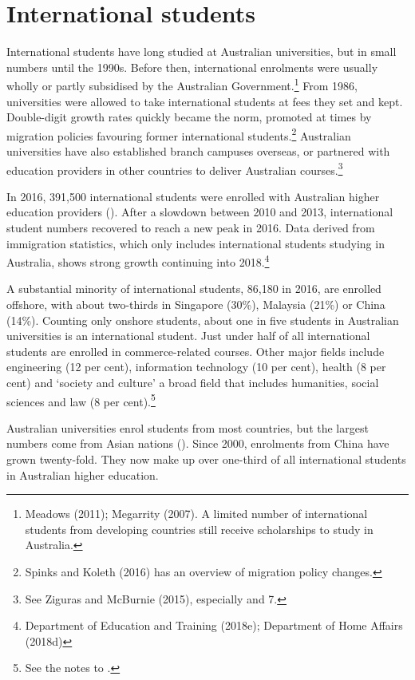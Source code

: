 \documentclass{grattan}
\begin{document}
%
\section{International students }\label{sec:international-students}

International students have long studied at Australian universities, but in small numbers until the 1990s. Before then, international enrolments were usually wholly or partly subsidised by the Australian Government.\footnote{Meadows (2011); Megarrity (2007). A limited number of international students from developing countries still receive scholarships to study in Australia.} From 1986, universities were allowed to take international students at fees they set and kept. Double-digit growth rates quickly became the norm, promoted at times by migration policies favouring former international students.\footnote{Spinks and Koleth (2016) has an overview of migration policy changes.} Australian universities have also established branch campuses overseas, or partnered with education providers in other countries to deliver Australian courses.\footnote{See Ziguras and McBurnie (2015), especially  and 7.}

In 2016, 391,500 international students were enrolled with Australian higher education providers (). After a slowdown between 2010 and 2013, international student numbers recovered to reach a new peak in 2016. Data derived from immigration statistics, which only includes international students studying in Australia, shows strong growth continuing into 2018.\footnote{Department of Education and Training (2018e); Department of Home Affairs (2018d)}

A substantial minority of international students, 86,180 in 2016, are enrolled offshore, with about two-thirds in Singapore (30\%), Malaysia (21\%) or China (14\%). Counting only onshore students, about one in five students in Australian universities is an international student. Just under half of all international students are enrolled in commerce-related courses. Other major fields include engineering (12 per cent), information technology (10 per cent), health (8 per cent) and `society and culture' a broad field that includes humanities, social sciences and law (8 per cent).\footnote{See the notes to .}

Australian universities enrol students from most countries, but the largest numbers come from Asian nations (). Since 2000, enrolments from China have grown twenty-fold. They now make up over one-third of all international students in Australian higher education.
\end{document}
